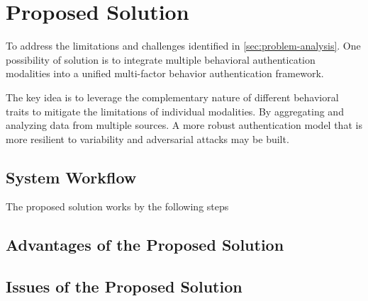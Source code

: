 \section{Proposed Solution}

To address the limitations and challenges identified in \ref{sec:problem-analysis}. One possibility of solution is to integrate multiple behavioral authentication modalities into a unified multi-factor behavior authentication framework.

The key idea is to leverage the complementary nature of different behavioral traits to mitigate the limitations of individual modalities. By aggregating and analyzing data from multiple sources. A more robust authentication model that is more resilient to variability and adversarial attacks may be built.

\subsection{System Workflow}
The proposed solution works by the following steps

\subsection{Advantages of the Proposed Solution}


\subsection{Issues of the Proposed Solution}

